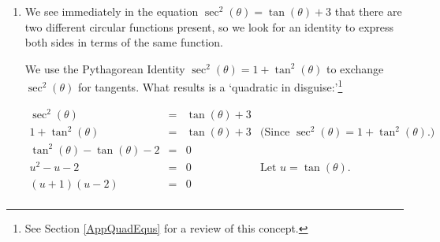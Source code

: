 \documentclass{ximera}
\begin{document}
\begin{example}
\begin{explanation}
\begin{enumerate}
\[\begin{array}{rclr}
3\sin^{3}(\theta) & = &  \sin^{2}(\theta) & \\
3\sin^{3}(\theta) -  \sin^{2}(\theta) & = & 0 &  \\
\sin^{2}(\theta) (3 \sin(\theta) - 1) & = & 0 & \text{Factor out $\sin^{2}(\theta)$ from both terms.} \\ \end{array} \]

We get $\sin^{2}(\theta) = 0$ or $3\sin(\theta) - 1 = 0$, so $\sin(\theta) = 0$ or $\sin(\theta) = \frac{1}{3}$.  The solution to $\sin(\theta) = 0$ is $\theta = \pi k$, with $\theta = 0$ and $\theta = \pi$ being the two solutions which lie in $[0,2\pi)$.  

 

To solve $\sin(\theta) = \frac{1}{3}$, we use the arcsine function to get $\theta = \arcsin\left(\frac{1}{3}\right) + 2\pi k$ or $\theta = \pi - \arcsin\left(\frac{1}{3}\right) + 2\pi k$ for integers $k$. We find the two solutions here which lie in $[0,2\pi)$ to be $\theta = \arcsin\left(\frac{1}{3}\right) \approx 0.34$ and $\theta = \pi - \arcsin\left(\frac{1}{3}\right) \approx 2.80$.  

To check graphically, we plot $y = 3(\sin(\theta))^3$ and $y = (\sin(\theta))^2$ and find the  $\theta$-coordinates of the intersection points of these two curves.\footnote{Note that we do \textit{not} list  $\theta = 2\pi$ as part of the solution over the interval $[0,2\pi)$ since $2\pi$ is not in $[0, 2\pi)$.}  (Some extra zooming may be required near $\theta=0$ and $\theta=\pi$ to verify that these two curves do in fact intersect four times.)  

\begin{center}
\end{center} 

\item We see immediately in the equation $\sec^{2}(\theta) = \tan(\theta) + 3$ that there are two different circular functions present, so we look for an identity to express both sides in terms of the same function.  

We use the Pythagorean Identity $\sec^{2}(\theta) = 1 + \tan^{2}(\theta)$ to exchange $\sec^{2}(\theta)$  for tangents.  What results is a `quadratic in disguise:'\footnote{See Section \ref{AppQuadEqus} for a review of this concept.}

\[ \begin{array}{rclr}

\sec^{2}(\theta) &  = & \tan(\theta) + 3 & \\
1 + \tan^{2}(\theta) & = & \tan(\theta) + 3& \text{(Since $\sec^{2}(\theta) = 1 + \tan^{2}(\theta)$.)} \\
\tan^{2}(\theta) - \tan(\theta) -2 & = & 0 & \\
u^2 - u - 2 & = & 0 & \text{Let $u = \tan(\theta)$.} \\
(u + 1)(u - 2) & = & 0 & \\ \end{array} \]


\end{enumerate}
\end{explanation}
\end{example}
\end{document}
